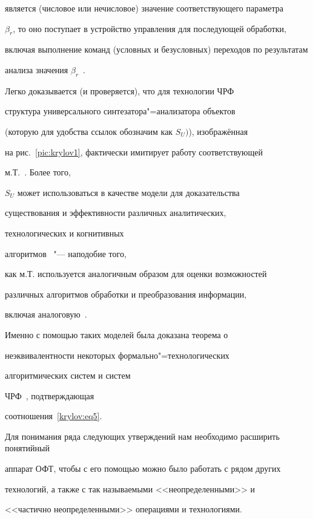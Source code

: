 является (числовое или нечисловое) значение соответствующего параметра

$\beta_{r}$, то оно поступает в устройство управления для последующей обработки,

включая выполнение команд (условных и безусловных) переходов по результатам

анализа значения $\beta_{r}$~\cite{krylov:bib3,krylov:bib6,krylov:bib17-1,krylov:bib17-2}.



Легко доказывается (и проверяется), что для технологии ЧРФ

структура универсального синтезатора"=анализатора объектов

(которую для удобства ссылок обозначим как $S_U)$), изображённая

на рис.~\ref{pic:krylov1}, фактически имитирует работу соответствующей

м.Т.~\cite{krylov:bib3,krylov:bib6,krylov:bib17-1, krylov:bib17-2}. Более того,

$S_U$ может использоваться в качестве модели для доказательства

существования и эффективности различных аналитических,

технологических и когнитивных

алгоритмов~\cite{krylov:bib7,krylov:bib18} "--- наподобие того,

как м.Т. используется аналогичным образом для оценки возможностей

различных алгоритмов обработки и преобразования информации,

включая аналоговую~\cite{krylov:bib13,krylov:bib19,krylov:bib20}.

Именно с помощью таких моделей была доказана теорема о

неэквивалентности некоторых формально"=технологических

алгоритмических систем и систем

ЧРФ~\cite{krylov:bib6,krylov:bib21}, подтверждающая

соотношения~\eqref{krylov:eq5}.



Для понимания ряда следующих утверждений нам необходимо расширить понятийный

аппарат ОФТ, чтобы с его помощью можно было работать с рядом других

технологий, а также с так называемыми <<неопределенными>> и

<<частично неопределенными>> операциями и технологиями.




